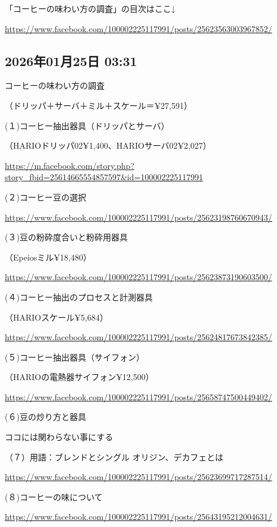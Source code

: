 \documentclass[facebook_diary.tex]{subfiles}
\begin{document}
「コーヒーの味わい方の調査」の目次はここ↓

\url{https://www.facebook.com/100002225117991/posts/25623563003967852/}



\subsection*{2026年01月25日 03:31}

コーヒーの味わい方の調査

（ドリッパ＋サーバ＋ミル＋スケール＝¥27,591）


(１)コーヒー抽出器具（ドリッパとサーバ）

（HARIOドリッパ02¥1,400、HARIOサーバ02¥2,027）

\url{https://m.facebook.com/story.php?story_fbid=25614665554857597&id=100002225117991}




(２)コーヒー豆の選択

\url{https://www.facebook.com/100002225117991/posts/25623198760670943/}




(３)豆の粉砕度合いと粉砕用器具

（Epeiosミル¥18,480）

\url{https://www.facebook.com/100002225117991/posts/25623873190603500/}




(４)コーヒー抽出のプロセスと計測器具

（HARIOスケール¥5,684）

\url{https://www.facebook.com/100002225117991/posts/25624817673842385/}




(５)コーヒー抽出器具（サイフォン）

（HARIOの電熱器サイフォン¥12,500）

\url{https://www.facebook.com/100002225117991/posts/25658747500449402/}




(６)豆の炒り方と器具

ココには関わらない事にする


（７）用語：ブレンドとシングル オリジン、デカフェとは

\url{https://www.facebook.com/100002225117991/posts/25623699717287514/}




(８)コーヒーの味について

\url{https://www.facebook.com/100002225117991/posts/25643195212004631/}
\end{document}
